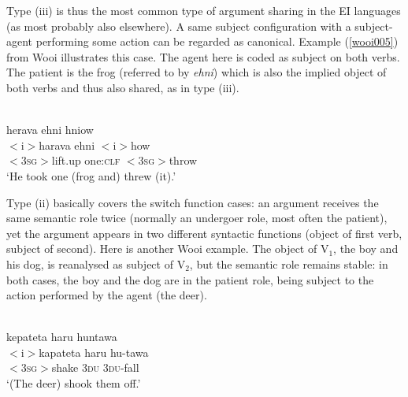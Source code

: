 Type (iii) is thus the most common type of argument sharing in the EI languages (as most probably also elsewhere). A same subject configuration with a subject-agent performing some action can be regarded as canonical. Example (\ref{wooi005}) from Wooi illustrates this case. The agent here is coded as subject on both verbs. The patient is the frog (referred to by \textit{ehni}) which is also the implied object of both verbs and thus also shared, as in type (iii).

\ea \label{wooi005}
\\
\glll herava ehni hniow \\
$<$i$>$harava ehni $<$i$>$how \\
$<$3\textsc{sg}$>$lift.up one:\textsc{clf} $<$3\textsc{sg}$>$throw \\
\glft `He took one (frog and) threw (it).'\\ 
\z

Type (ii) basically covers the switch function cases: an argument receives the same semantic role twice (normally an undergoer role, most often the patient), yet the argument appears in two different syntactic functions (object of first verb, subject of second). Here is another Wooi example. The object of V$_1$, the boy and his dog, is reanalysed as subject of V$_2$, but the semantic role remains stable: in both cases, the boy and the dog are in the patient role, being subject to the action performed by the agent (the deer).

\ea \label{}
\\
\glll kepateta haru huntawa \\
$<$i$>$kapateta haru hu-tawa \\
$<$3\textsc{sg}$>$shake 3\textsc{du} 3\textsc{du}-fall \\
\glft `(The deer) shook them off.'\\ 
\z

